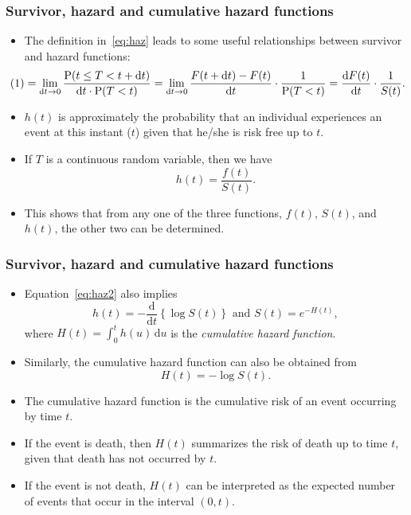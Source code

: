 \documentclass[10pt]{beamer}\usepackage[]{graphicx}\usepackage[]{color}
\newcommand{\dif}{\mathrm{d}}
\newcommand{\dt}{\mathrm{d}t}
\newcommand{\empr}[1]{{\emph{\color{red}#1}}}
\newcommand{\p}{\mathrm{P}}
\begin{document}
\begin{frame}
  \frametitle{Survivor, hazard and cumulative hazard functions}
  \begin{itemize}
    \item The definition in~\eqref{eq:haz} leads to some useful relationships between survivor and hazard functions:
      \begin{equation*}
        \hspace{-.5cm}
        (1) = \lim_{\dt\to0}\frac{\p(t\le T < t + \dt)}{\dt\cdot\p(T < t)} = 
        \lim_{\dt\to0}\frac{F(t + \dt) - F(t)}{\dt} \cdot \frac{1}{\p(T < t)} =
        \frac{\dif F(t)}{\dif t}\cdot \frac{1}{S(t)}.
      \end{equation*}
    \item $h(t)$ is approximately the probability that an individual experiences an event at this instant ($t$)
      given that he/she is risk free up to $t$.
    \item If $T$ is a continuous random variable, then we have 
      \begin{equation}
        h(t) = \frac{f(t)}{S(t)}.
        \label{eq:haz2}
      \end{equation}
    \item This shows that from any one of the three functions, $f(t)$, $S(t)$, and $h(t)$, 
      the other two can be determined. 
  \end{itemize}
\end{frame}

\begin{frame}
  \frametitle{Survivor, hazard and cumulative hazard functions}
  \begin{itemize}
    \item Equation~\eqref{eq:haz2} also implies
      $$h(t) = -\frac{\dif}{\dif t}\left\{ \log S(t)\right\} \mbox{ and } S(t) = e^{-H(t)},$$
      where $H(t) = \int_0^th(u)\,\dif u$ is the \empr{cumulative hazard function}.
    \item Similarly, the cumulative hazard function can also be obtained from 
      $$H(t) = -\log S(t).$$
    \item The cumulative hazard function is the cumulative risk of an event occurring by time $t$.
    \item If the event is death, then $H(t)$ summarizes the risk of death up to time $t$, given that death has not occurred by $t$.
    \item If the event is not death, $H(t)$ can be interpreted as the expected number of events that occur in the interval $(0, t)$.
  \end{itemize}
\end{frame}
\end{document}
